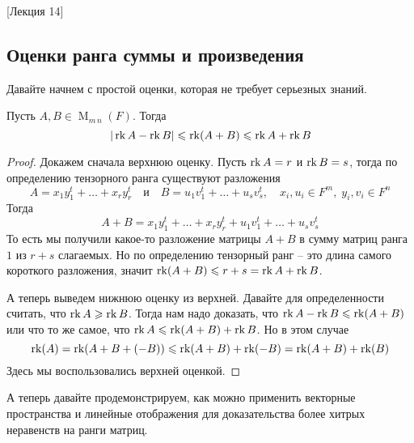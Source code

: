 [Лекция 14]


\subsection{Оценки ранга суммы и произведения}

Давайте начнем с простой оценки, которая не требует серьезных знаний.

\begin{claim}
Пусть $A,B\in \operatorname{M}_{m\, n}(F)$.
Тогда
\[
|\operatorname{rk} A - \operatorname{rk} B| \leqslant \operatorname{rk}(A + B) \leqslant \operatorname{rk} A + \operatorname{rk} B
\]
\end{claim}
\begin{proof}
Докажем сначала верхнюю оценку.
Пусть $\operatorname{rk} A = r$ и $\operatorname{rk} B = s$, тогда по определению тензорного ранга существуют разложения
\[
A = x_1 y_1^t + \ldots + x_r y_r^t\quad \text{и}\quad
B = u_1 v_1^t + \ldots + u_s v_s^t,\quad x_i, u_i\in F^m,\;y_i,v_i\in F^n
\]
Тогда
\[
A + B = x_1 y_1^t + \ldots + x_r y_r^t + u_1 v_1^t + \ldots + u_s v_s^t
\]
То есть мы получили какое-то разложение матрицы $A+ B$ в сумму матриц ранга $1$ из $r+s$ слагаемых.
Но по определению тензорный ранг -- это длина самого короткого разложения, значит $\operatorname{rk}(A+B) \leqslant r + s = \operatorname{rk} A + \operatorname{rk} B$.

А теперь выведем нижнюю оценку из верхней.
Давайте для определенности считать, что  $\operatorname{rk} A \geqslant \operatorname{rk} B$.
Тогда нам надо доказать, что $\operatorname{rk} A - \operatorname{rk} B \leqslant \operatorname{rk}(A + B)$ или что то же самое, что $\operatorname{rk} A \leqslant \operatorname{rk} (A+B) + \operatorname{rk} B$.
Но в этом случае
\[
\operatorname{rk} (A) = \operatorname{rk}(A + B + (-B)) \leqslant \operatorname{rk}(A+B) +\operatorname{rk}(-B) = \operatorname{rk} (A+B) + \operatorname{rk}(B)
\]
Здесь мы воспользовались верхней оценкой.
\end{proof}


А теперь давайте продемонстрируем, как можно применить векторные пространства и линейные отображения для доказательства более хитрых неравенств на ранги матриц.


